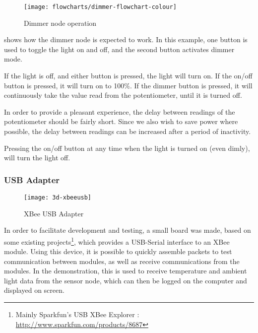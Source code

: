 \begin{figure}[!h]
  \begin{center}
    \texttt{[image: flowcharts/dimmer-flowchart-colour]}
  \end{center}
  \caption{Dimmer node operation}
  \label{fig:dimmer-flowchart}
\end{figure}

 shows how the dimmer node is expected to work. In
this example, one button is used to toggle the light on and off, and the second
button activates dimmer mode. 

If the light is off, and either button is pressed, the light will turn on. If
the on/off button is pressed, it will turn on to 100\%. If the dimmer button is
pressed, it will continuously take the value read from the potentiometer, until
it is turned off.

In order to provide a pleasant experience, the delay between readings of the
potentiometer should be fairly short. Since we also wish to save power where
possible, the delay between readings can be increased after a period of
inactivity.

Pressing the on/off button at any time when the light is turned on (even dimly),
will turn the light off.


\subsubsection{USB Adapter}
\label{sub2:xbee-usb}

\begin{figure}[h]
  \begin{center}
    \texttt{[image: 3d-xbeeusb]}
  \end{center}
  \caption{XBee USB Adapter}
  \label{fig:xbeeusb}
\end{figure}

In order to facilitate development and testing, a small board was made,
based on some existing projects\footnote{Mainly Sparkfun's USB XBee Explorer :
\url{http://www.sparkfun.com/products/8687}}, which provides a USB-Serial
interface to an XBee module. Using this device, it is possible to quickly
assemble packets to test communication between modules, as well as receive
communications from the modules. In the demonstration, this is used to receive
temperature and ambient light data from the sensor node, which can then be
logged on the computer and displayed on screen.

